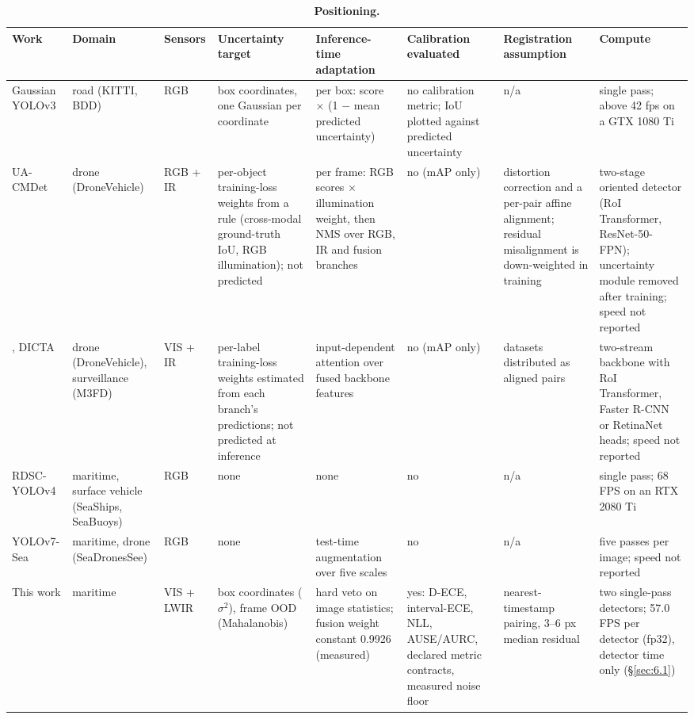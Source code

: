 \documentclass[10pt]{article}
\begin{document}
\begin{table}[htbp]
\centering
\scriptsize
\caption{\textbf{Positioning.}}
\label{tab:R}
\setlength{\tabcolsep}{3pt}
\begin{tabularx}{\linewidth}{>{\raggedright\arraybackslash}X>{\raggedright\arraybackslash}Xl>{\raggedright\arraybackslash}X>{\raggedright\arraybackslash}X>{\raggedright\arraybackslash}X>{\raggedright\arraybackslash}X>{\raggedright\arraybackslash}X}
\toprule
Work & Domain & Sensors & Uncertainty target & Inference-time adaptation & Calibration evaluated & Registration assumption & Compute \\
\midrule
Gaussian YOLOv3 \citep{choi2019gaussian} & road (KITTI, BDD) & RGB & box coordinates, one Gaussian per coordinate & per box: score $\times$ (1 $-$ mean predicted uncertainty) & no calibration metric; IoU plotted against predicted uncertainty & n/a & single pass; above 42 fps on a GTX 1080 Ti \\
UA-CMDet \citep{sun2022dronebased} & drone (DroneVehicle) & RGB + IR & per-object training-loss weights from a rule (cross-modal ground-truth IoU, RGB illumination); not predicted & per frame: RGB scores $\times$ illumination weight, then NMS over RGB, IR and fusion branches & no (mAP only) & distortion correction and a per-pair affine alignment; residual misalignment is down-weighted in training & two-stage oriented detector (RoI Transformer, ResNet-50-FPN); uncertainty module removed after training; speed not reported \\
\citet{zhao2024uncertaintyaware}, DICTA & drone (DroneVehicle), surveillance (M3FD) & VIS + IR & per-label training-loss weights estimated from each branch's predictions; not predicted at inference & input-dependent attention over fused backbone features & no (mAP only) & datasets distributed as aligned pairs & two-stream backbone with RoI Transformer, Faster R-CNN or RetinaNet heads; speed not reported \\
RDSC-YOLOv4 \citep{liu2021sea} & maritime, surface vehicle (SeaShips, SeaBuoys) & RGB & none & none & no & n/a & single pass; 68 FPS on an RTX 2080 Ti \\
YOLOv7-Sea \citep{zhao2023yolov7sea} & maritime, drone (SeaDronesSee) & RGB & none & test-time augmentation over five scales & no & n/a & five passes per image; speed not reported \\
This work & maritime & VIS + LWIR & box coordinates ($\sigma$$^{2}$), frame OOD (Mahalanobis) & hard veto on image statistics; fusion weight constant 0.9926 (measured) & yes: D-ECE, interval-ECE, NLL, AUSE/AURC, declared metric contracts, measured noise floor & nearest-timestamp pairing, 3--6 px median residual & two single-pass detectors; 57.0 FPS per detector (fp32), detector time only (\S\ref{sec:6.1}) \\
\bottomrule
\end{tabularx}
\end{table}
\FloatBarrier
\end{document}
